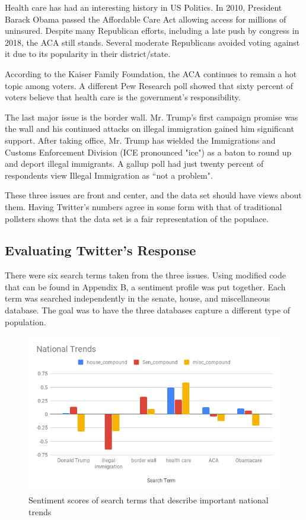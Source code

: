\documentclass[11pt, twoside, reqno]{book}
\begin{document}
Health care has had an interesting history in US Politics. In 2010, President Barack Obama passed the Affordable Care Act allowing access for millions of uninsured. Despite many Republican efforts, including a late push by congress in 2018, the ACA still stands. Several moderate Republicans avoided voting against it due to its popularity in their district/state. 

According to the Kaiser Family Foundation, the ACA continues to remain a hot topic among voters\cite{kff}. A different Pew Research poll showed that sixty percent of voters believe that health care is the government's responsibility\cite{gallup_immigration}. 

The last major issue is the border wall. Mr. Trump's first campaign promise was the wall and his continued attacks on illegal immigration gained him significant support. After taking office, Mr. Trump has wielded the Immigrations and Customs Enforcement Division (ICE pronounced "ice") as a baton to round up and deport illegal immigrants. A gallup poll had just twenty percent of respondents view Illegal Immigration as ``not a problem". 

These three issues are front and center, and the data set should have views about them. Having Twitter's numbers agree in some form with that of traditional pollsters shows that the data set is a fair representation of the populace. 

\subsection{Evaluating Twitter's Response}
\hspace{0.2in}There were six search terms taken from the three issues. Using modified code that can be found in Appendix B, a sentiment profile was put together. Each term was searched independently in the senate, house, and miscellaneous database. The goal was to have the three databases capture a different type of population. 
\begin{figure}[H]
	\includegraphics[scale=0.65]{natty_trends}	
	\caption{Sentiment scores of search terms that describe important national trends}
	\label{fig:natty_trends}
\end{figure}
\end{document}
